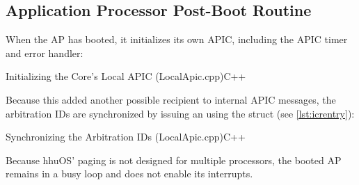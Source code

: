 \subsection{Application Processor Post-Boot Routine}
\label{subsec:apxappostboot}

When the AP has booted, it initializes its own APIC, including the APIC timer and error handler:

\begin{codeblock}{Initializing the Core's Local APIC (LocalApic.cpp)}{C++}
\end{codeblock}

Because this added another possible recipient to internal APIC messages, the arbitration IDs are synchronized by issuing an  using the  struct (see \autoref{lst:icrentry}):

\begin{codeblock}{Synchronizing the Arbitration IDs (LocalApic.cpp)}{C++}
\end{codeblock}

Because hhuOS' paging is not designed for multiple processors, the booted AP remains in a busy loop and does not enable its interrupts.

\cleardoublepage